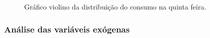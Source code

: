 \documentclass[	12pt, Times, openright, twoside, a4paper, english, brazil]{abntex2}
\begin{document}
\begin{center}
\begin{minipage}[c]{0.45\textwidth}
\begin{figure}[H]
{                	\caption{Gráfico violino da distribuição do consumo na quinta feira.} \label{fig:case1_violinplot_quinta} }
                \end{figure}\end{minipage} %
                        \begin{minipage}[c]{0.45\textwidth}
                \begin{figure}[H]
                \end{figure}
                \end{minipage} \end{center} 
            
    	    \subsubsection{Análise das variáveis exógenas}
\end{document}
